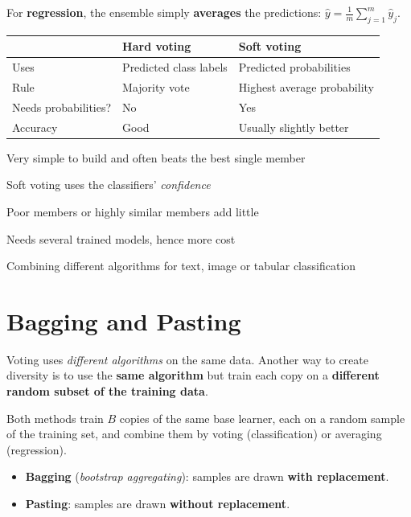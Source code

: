 For \textbf{regression}, the ensemble simply \textbf{averages} the predictions: $\hat y=\frac1m\sum_{j=1}^{m}\hat y_j$.

\begin{center}
\begin{tabular}{@{}p{3.1cm}p{5.4cm}p{5.4cm}@{}}
\toprule
 & \textbf{Hard voting} & \textbf{Soft voting}\\
\midrule
Uses & Predicted class labels & Predicted probabilities\\
Rule & Majority vote & Highest average probability\\
Needs probabilities? & No & Yes\\
Accuracy & Good & Usually slightly better\\
\bottomrule
\end{tabular}
\end{center}

{\item Very simple to build and often beats the best single member
 \item Soft voting uses the classifiers' \emph{confidence}}
{\item Poor members or highly similar members add little
 \item Needs several trained models, hence more cost}
{\item Combining different algorithms for text, image or tabular classification}

\section{Bagging and Pasting}

Voting uses \emph{different algorithms} on the same data. Another way to create diversity is to use the \textbf{same algorithm} but train each copy on a \textbf{different random subset of the training data}.

\begin{definition}
Both methods train $B$ copies of the same base learner, each on a random sample of the training set, and combine them by voting (classification) or averaging (regression).
\begin{itemize}
  \item \textbf{Bagging} (\emph{bootstrap aggregating}): samples are drawn \textbf{with replacement}.
  \item \textbf{Pasting}: samples are drawn \textbf{without replacement}.
\end{itemize}
\end{definition}

